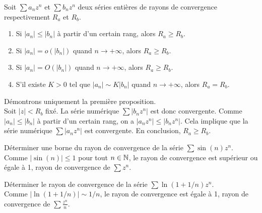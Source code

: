 \documentclass{book}
\begin{document}
\begin{Proposition}
Soit $\sum a_n z^n$ et $\sum b_n z^n$ deux séries entières de rayons de convergence
respectivement $R_a$ et $R_b$.
\begin{enumerate}
\item
  Si $|a_n| \leq  |b_n| $ à partir d'un certain rang, alors $R_a\geq R_b$.
\item
  Si $|a_n| = o \left(  |b_n| \right)$   quand $n\to+\infty $, alors $R_a\geq R_b$.
\item
  Si $|a_n| = O \left(  |b_n| \right)$   quand $n\to+\infty $, alors $R_a\geq R_b$.
\item
  S'il existe  $K>0$ tel que $|a_n| \sim K  |b_n|$ quand $n\to+\infty $, alors $R_a = R_b$.
\end{enumerate}
\end{Proposition}
\begin{Demonstration}
Démontrons uniquement la première proposition.\\
Soit $|z|<R_b$ fixé. La série numérique $\sum |b_n z^n|$ est donc convergente. Comme $|a_n| \leq  |b_n| $ à partir d'un certain rang, on a 
$|a_n z^n| \leq  |b_n z^n| $. Cela implique que la série numérique $\sum |a_n z^n|$ est  convergente. En conclusion, $R_a\geq R_b$.
\end{Demonstration}
\begin{Exemple}
Déterminer une borne du rayon de convergence de la série $\sum \sin(n)z^n$.\\
Comme $|\sin(n)|\leq 1$ pour tout $n\in \mathbb{N}$, le rayon de convergence est supérieur ou égale à 1, rayon de convergence de $\sum z^n$. 
\end{Exemple}
\begin{Exemple}
Déterminer le rayon de convergence de la série $\sum \ln(1+1/n)z^n$.\\
Comme $|\ln(1+1/n)|\sim 1/n$, le rayon de convergence est égale à 1, rayon de convergence de $\sum \frac{z^n}{n}$. 
\end{Exemple}
\end{document}
